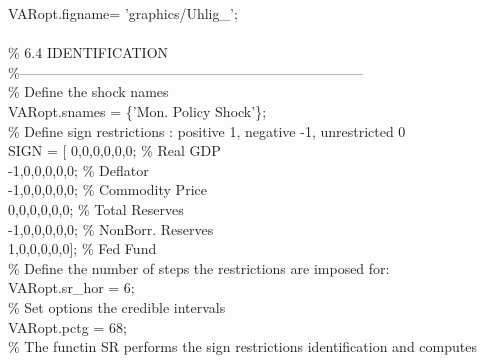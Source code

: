 \hspace{1mm}VARopt.figname= \textcolor{matlabpurple}{'graphics/Uhlig\_'}; \\ 
\hspace{1mm} \\ 
\hspace{1mm}\textcolor{matlabgreen}{\% 6.4 IDENTIFICATION }\\ 
\hspace{1mm}\textcolor{matlabgreen}{\%--------------------------------------------------------------------------  }\\ 
\hspace{1mm}\textcolor{matlabgreen}{\% Define the shock names }\\ 
\hspace{1mm}VARopt.snames = \{\textcolor{matlabpurple}{'Mon. Policy Shock'}\}; \\ 
\hspace{1mm}\textcolor{matlabgreen}{\% Define sign restrictions : positive 1, negative -1, unrestricted 0 }\\ 
\hspace{1mm}SIGN = [ 0,0,0,0,0,0;  \textcolor{matlabgreen}{\% Real GDP }\\ 
\hspace{1mm}-1,0,0,0,0,0;  \textcolor{matlabgreen}{\% Deflator }\\ 
\hspace{1mm}-1,0,0,0,0,0;  \textcolor{matlabgreen}{\% Commodity Price }\\ 
\hspace{1mm}0,0,0,0,0,0;  \textcolor{matlabgreen}{\% Total Reserves }\\ 
\hspace{1mm}-1,0,0,0,0,0;  \textcolor{matlabgreen}{\% NonBorr. Reserves }\\ 
\hspace{1mm}1,0,0,0,0,0]; \textcolor{matlabgreen}{\% Fed Fund }\\ 
\hspace{1mm}\textcolor{matlabgreen}{\% Define the number of steps the restrictions are imposed for: }\\ 
\hspace{1mm}VARopt.sr\_hor = 6; \\ 
\hspace{1mm}\textcolor{matlabgreen}{\% Set options the credible intervals }\\ 
\hspace{1mm}VARopt.pctg = 68; \\ 
\hspace{1mm}\textcolor{matlabgreen}{\% The functin SR performs the sign restrictions identification and computes }\\ 
